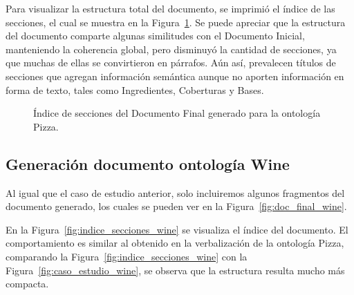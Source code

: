Para visualizar la estructura total del documento, se imprimió el índice de las secciones, el cual se muestra en la Figura~\ref{fig:indice_secciones_pizza}. Se puede apreciar que la estructura del documento comparte algunas similitudes con el Documento Inicial, manteniendo la coherencia global, pero disminuyó la cantidad de secciones, ya que muchas de ellas se convirtieron en párrafos. Aún así, prevalecen títulos de secciones que agregan información semántica aunque no aporten información en forma de texto, tales como Ingredientes, Coberturas y Bases.

\begin{figure}
\begin{multicols}{2}
\begin{figure}[H]
\end{figure}

\begin{figure}[H]
\end{figure}
\end{multicols}
\caption{Índice de secciones del Documento Final generado para la ontología Pizza.}
\label{fig:indice_secciones_pizza}
\end{figure}


\subsection{Generación documento ontología Wine}
Al igual que el caso de estudio anterior, solo incluiremos algunos fragmentos del documento generado, los cuales se pueden ver en la Figura~\ref{fig:doc_final_wine}.

En la Figura~\ref{fig:indice_secciones_wine} se visualiza el índice del documento. El comportamiento es similar al obtenido en la verbalización de la ontología Pizza, comparando la Figura~\ref{fig:indice_secciones_wine} con la Figura~\ref{fig:caso_estudio_wine}, se observa que la estructura resulta mucho más compacta.


